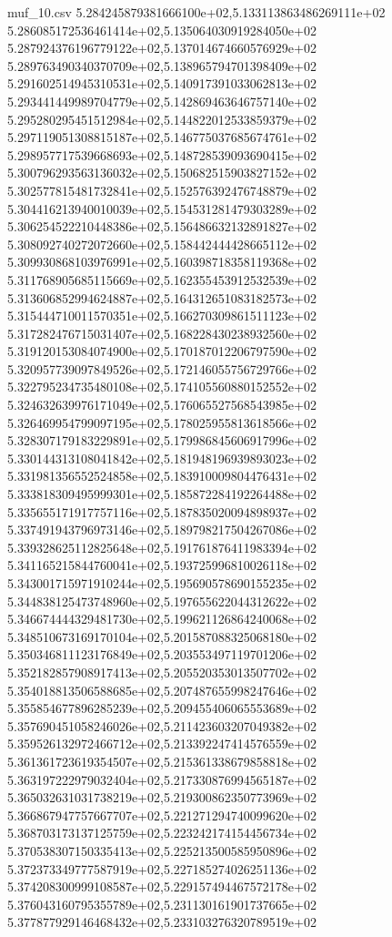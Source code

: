 \begin{filecontents*}{muf_10.csv}
5.284245879381666100e+02,5.133113863486269111e+02
5.286085172536461414e+02,5.135064030919284050e+02
5.287924376196779122e+02,5.137014674660576929e+02
5.289763490340370709e+02,5.138965794701398409e+02
5.291602514945310531e+02,5.140917391033062813e+02
5.293441449989704779e+02,5.142869463646757140e+02
5.295280295451512984e+02,5.144822012533859379e+02
5.297119051308815187e+02,5.146775037685674761e+02
5.298957717539668693e+02,5.148728539093690415e+02
5.300796293563136032e+02,5.150682515903827152e+02
5.302577815481732841e+02,5.152576392476748879e+02
5.304416213940010039e+02,5.154531281479303289e+02
5.306254522210448386e+02,5.156486632132891827e+02
5.308092740272072660e+02,5.158442444428665112e+02
5.309930868103976991e+02,5.160398718358119368e+02
5.311768905685115669e+02,5.162355453912532539e+02
5.313606852994624887e+02,5.164312651083182573e+02
5.315444710011570351e+02,5.166270309861511123e+02
5.317282476715031407e+02,5.168228430238932560e+02
5.319120153084074900e+02,5.170187012206797590e+02
5.320957739097849526e+02,5.172146055756729766e+02
5.322795234735480108e+02,5.174105560880152552e+02
5.324632639976171049e+02,5.176065527568543985e+02
5.326469954799097195e+02,5.178025955813618566e+02
5.328307179183229891e+02,5.179986845606917996e+02
5.330144313108041842e+02,5.181948196939893023e+02
5.331981356552524858e+02,5.183910009804476431e+02
5.333818309495999301e+02,5.185872284192264488e+02
5.335655171917757116e+02,5.187835020094898937e+02
5.337491943796973146e+02,5.189798217504267086e+02
5.339328625112825648e+02,5.191761876411983394e+02
5.341165215844760041e+02,5.193725996810026118e+02
5.343001715971910244e+02,5.195690578690155235e+02
5.344838125473748960e+02,5.197655622044312622e+02
5.346674444329481730e+02,5.199621126864240068e+02
5.348510673169170104e+02,5.201587088325068180e+02
5.350346811123176849e+02,5.203553497119701206e+02
5.352182857908917413e+02,5.205520353013507702e+02
5.354018813506588685e+02,5.207487655998247646e+02
5.355854677896285239e+02,5.209455406065553689e+02
5.357690451058246026e+02,5.211423603207049382e+02
5.359526132972466712e+02,5.213392247414576559e+02
5.361361723619354507e+02,5.215361338679858818e+02
5.363197222979032404e+02,5.217330876994565187e+02
5.365032631031738219e+02,5.219300862350773969e+02
5.366867947757667707e+02,5.221271294740099620e+02
5.368703173137125759e+02,5.223242174154456734e+02
5.370538307150335413e+02,5.225213500585950896e+02
5.372373349777587919e+02,5.227185274026251136e+02
5.374208300999108587e+02,5.229157494467572178e+02
5.376043160795355789e+02,5.231130161901737665e+02
5.377877929146468432e+02,5.233103276320789519e+02

\end{filecontents*}
